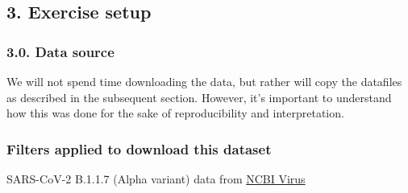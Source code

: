 \documentclass[
]{book}
\begin{document}
\subsection{3. Exercise setup}\label{exercise-setup}

\subsubsection{3.0. Data source}\label{data-source}

We will not spend time downloading the data, but rather will copy the datafiles as described in the subsequent section. However, it's important to understand how this was done for the sake of reproducibility and interpretation.

\subsubsection{Filters applied to download this dataset}\label{filters-applied-to-download-this-dataset}

SARS-CoV-2 B.1.1.7 (Alpha variant) data from \href{https://www.ncbi.nlm.nih.gov/labs/virus/vssi/\#/}{NCBI Virus}
\end{document}
